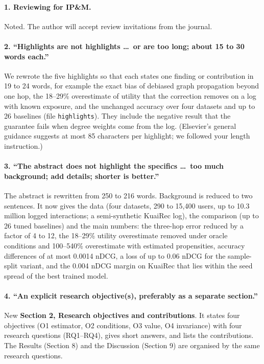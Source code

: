 \documentclass[11pt]{article}
\begin{document}
\paragraph{1. Reviewing for IP\&M.}
Noted. The author will accept review invitations from the journal.

\paragraph{2. ``Highlights are not highlights \dots\ or are too long; about 15 to 30 words each.''}
We rewrote the five highlights so that each states one finding or contribution in 19 to 24 words,
for example the exact bias of debiased graph propagation beyond one hop, the 18--29\% overestimate of
utility that the correction removes on a log with known exposure, and the unchanged accuracy over
four datasets and up to 26 baselines (file \texttt{highlights}). They include the negative result
that the guarantee fails when degree weights come from the log. (Elsevier's general guidance
suggests at most 85 characters per highlight; we followed your length instruction.)

\paragraph{3. ``The abstract does not highlight the specifics \dots\ too much background; add details; shorter is better.''}
The abstract is rewritten from 250 to 216 words. Background is reduced to two sentences. It now
gives the data (four datasets, 290 to 15{,}400 users, up to 10.3 million logged interactions; a
semi-synthetic KuaiRec log), the comparison (up to 26 tuned baselines) and the main numbers: the
three-hop error reduced by a factor of 4 to 12, the 18--29\% utility overestimate removed under oracle
conditions and 100--540\% overestimate with estimated propensities, accuracy differences of at most
0.0014 nDCG, a loss of up to 0.06 nDCG for the sample-split variant, and the 0.004 nDCG margin on KuaiRec
that lies within the seed spread of the best trained model.

\paragraph{4. ``An explicit research objective(s), preferably as a separate section.''}
New \textbf{Section 2, Research objectives and contributions}. It states four objectives (O1
estimator, O2 conditions, O3 value, O4 invariance) with four research questions (RQ1--RQ4), gives
short answers, and lists the contributions. The Results (Section 8) and the Discussion (Section 9)
are organised by the same research questions.
\end{document}

